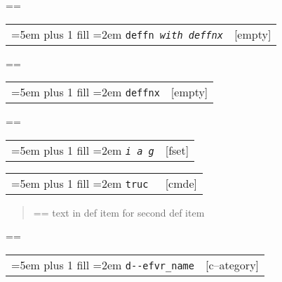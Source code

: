 \documentclass{book}
\makeatletter
\newcommand\GNUTexinfocommandstyletextvar[1]{{\normalfont{}\textsl{#1}}}%
\newenvironment{GNUTexinfopreformatted}{%
  \par\GNUTobeylines\obeyspaces\frenchspacing
  \parskip=\z@\parindent=\z@}{}
{\catcode`\^^M=13 \gdef\GNUTobeylines{\catcode`\^^M=13 \def^^M{\null\par}}}
\newenvironment{GNUTexinfoindented}
  {\begin{list}{}{}
  \item\relax}
  {\end{list}}
\makeatother
\begin{document}
\begin{GNUTexinfoindented}
%
\begin{GNUTexinfopreformatted}%
\ttfamily 
\end{GNUTexinfopreformatted}

\noindent\begin{tabularx}{\linewidth}{@{}Xr}
\rightskip=5em plus 1 fill
\hangindent=2em
\texttt{deffn \EmbracOn{}\textnormal{\textsl{with deffnx}}\EmbracOff{}}& [empty]
\end{tabularx}

%
\begin{GNUTexinfopreformatted}%
\ttfamily \end{GNUTexinfopreformatted}

\noindent\begin{tabularx}{\linewidth}{@{}Xr}
\rightskip=5em plus 1 fill
\hangindent=2em
\texttt{deffnx}& [empty]
\end{tabularx}

%
\begin{GNUTexinfopreformatted}%
\ttfamily 
\end{GNUTexinfopreformatted}

\noindent\begin{tabularx}{\linewidth}{@{}Xr}
\rightskip=5em plus 1 fill
\hangindent=2em
\texttt{\GNUTexinfocommandstyletextvar{i} \EmbracOn{}\textnormal{\textsl{a g}}\EmbracOff{}}& [fset]
\end{tabularx}

\index[fn]{i@\texttt{\GNUTexinfocommandstyletextvar{i}}}%

\noindent\begin{tabularx}{\linewidth}{@{}Xr}
\rightskip=5em plus 1 fill
\hangindent=2em
\texttt{truc \EmbracOn{}\textnormal{\textsl{}}\EmbracOff{}}& [cmde]
\end{tabularx}

%
\begin{quote}
\unskip{\parskip=0pt\noindent}%
\begin{GNUTexinfopreformatted}%
\ttfamily text in def item for second def item
\end{GNUTexinfopreformatted}
\end{quote}
\begin{GNUTexinfopreformatted}%
\ttfamily 

\end{GNUTexinfopreformatted}

\noindent\begin{tabularx}{\linewidth}{@{}Xr}
\rightskip=5em plus 1 fill
\hangindent=2em
\texttt{d{-}{-}efvr\_name}& [c--ategory]
\end{tabularx}


\end{GNUTexinfoindented}
\end{document}
